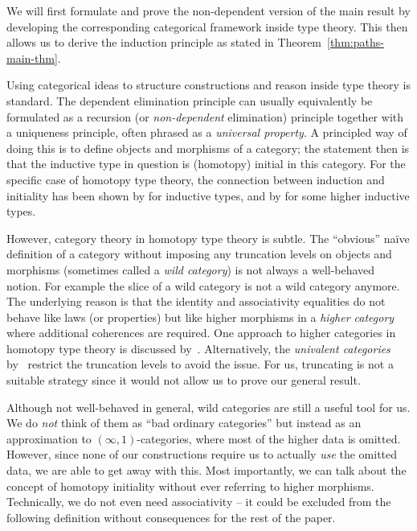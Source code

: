 We will first formulate and prove the non-dependent version of the main result
by developing the corresponding categorical framework inside type theory.
This then allows us to derive the induction principle as stated in Theorem~\ref{thm:paths-main-thm}.

Using categorical ideas to structure constructions and reason inside type
theory is standard.
The dependent elimination principle can usually equivalently be formulated
as a recursion (or \emph{non-dependent} elimination) principle together
with a uniqueness principle,
often phrased as a \emph{universal property}.
A principled way of doing this is to define objects and morphisms of a
category; the statement then is that the inductive type in question is
(homotopy) initial in this category.
For the specific case of homotopy type theory, the connection between
induction and initiality has been shown by
\cite{awodeyGamSoja_hoAlgs} for inductive types,
and by \cite{DBLP:journals/corr/Sojakova14} for some higher inductive types.

However, category theory in homotopy type theory is subtle.
The ``obvious'' naïve definition of a category without imposing any
truncation levels on objects and morphisms (sometimes called a
\emph{wild category}) is not always a well-behaved notion.
For example the slice of a wild category is not a wild category anymore.
The underlying reason is that the identity and associativity
equalities do not behave like laws (or properties) but like higher morphisms
in a \emph{higher category} where additional coherences are required.
One approach to higher categories in homotopy type theory
is discussed by~\cite{Capriotti2017}.
Alternatively, the \emph{univalent categories} by~\cite{ahrens_rezk}
restrict the truncation levels to avoid the issue.
For us,
truncating is not a suitable strategy since it would not allow us to prove our general result.

Although not well-behaved in general, wild categories are still a useful tool
for us.
We do \emph{not} think of them as ``bad ordinary categories'' but instead
as an approximation to $(\infty,1)$-categories, where most of the
higher data is omitted.
However, since none of our constructions require us to actually \emph{use}
the omitted data, we are able to get away with this.
Most importantly,
we can talk about the concept of homotopy initiality without ever referring
to higher morphisms.
Technically, we do not even need associativity -- it could be excluded from the
following definition without consequences for the rest of the paper.


